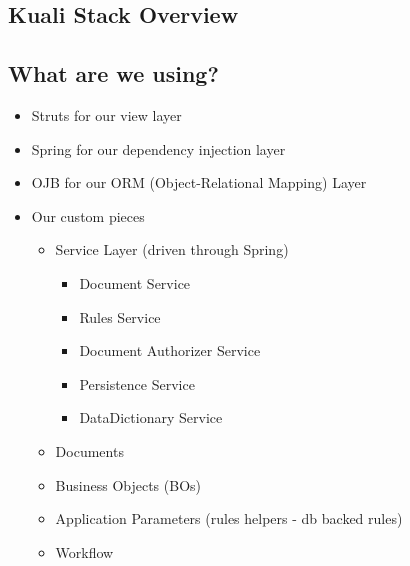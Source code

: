 \begin{ifhtml}
    \begin{s5slide}
        \section{Kuali Stack Overview}
        \begin{ifhtml}
        \end{ifhtml} 
    \end{s5slide}
    \begin{s5slide}
        \section{What are we using?}
            \begin{itemize}
                \item Struts for our view layer
                \item Spring for our dependency injection layer
                \item OJB for our ORM (Object-Relational Mapping) Layer
            \end{itemize}
            \begin{itemize}
                \item Our custom pieces
                \begin{itemize}
                    \item Service Layer (driven through Spring)
                    \begin{itemize}
                        \item Document Service
                        \item Rules Service
                        \item Document Authorizer Service
                        \item Persistence Service
                        \item DataDictionary Service
                    \end{itemize}
                    \item Documents
                    \item Business Objects (BOs)
                    \item Application Parameters (rules helpers - db backed rules)
                    \item Workflow
                \end{itemize}
            \end{itemize}
    \end{s5slide}
    \begin{s5slide}

\end{s5slide}
\end{ifhtml}
